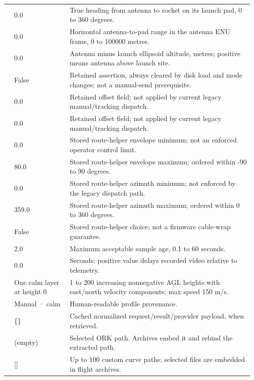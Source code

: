 \begin{longtable}{@{}L{.28\linewidth}L{.18\linewidth}L{.47\linewidth}@{}}
 & 0.0 & True heading from antenna to rocket on its launch pad, 0 to 360 degrees. \\
 & 0.0 & Horizontal antenna-to-pad range in the antenna ENU frame, 0 to 100000 metres. \\
 & 0.0 & Antenna minus launch ellipsoid altitude, metres; positive means antenna above launch site. \\
 & False & Retained assertion, always cleared by disk load and mode changes; not a manual-send prerequisite. \\
 & 0.0 & Retained offset field; not applied by current legacy manual/tracking dispatch. \\
 & 0.0 & Retained offset field; not applied by current legacy manual/tracking dispatch. \\
 & 0.0 & Stored route-helper envelope minimum; not an enforced operator control limit. \\
 & 80.0 & Stored route-helper envelope maximum; ordered within -90 to 90 degrees. \\
 & 0.0 & Stored route-helper azimuth minimum; not enforced by the legacy dispatch path. \\
 & 359.0 & Stored route-helper azimuth maximum; ordered within 0 to 360 degrees. \\
 & False & Stored route-helper choice; not a firmware cable-wrap guarantee. \\
 & 2.0 & Maximum acceptable sample age, 0.1 to 60 seconds. \\
 & 0.0 & Seconds; positive value delays recorded video relative to telemetry. \\
 & One calm layer at height 0 & 1 to 200 increasing nonnegative AGL heights with east/north velocity components; max speed 150 m/s. \\
 & Manual · calm & Human-readable profile provenance. \\
 & \{\} & Cached normalized request/result/provider payload, when retrieved. \\
 & (empty) & Selected ORK path. Archives embed it and rebind the extracted path. \\
 & [] & Up to 100 custom curve paths; selected files are embedded in flight archives. \\

\end{longtable}
